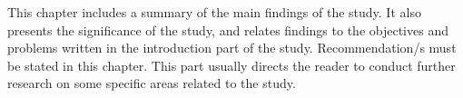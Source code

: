 This chapter includes a summary of the main findings of the study. It also presents the significance of the study, and relates findings to the objectives and problems written in the introduction part of the study. Recommendation/s must be stated in this chapter. This part usually directs the reader to conduct further research on some specific areas related to the study. 